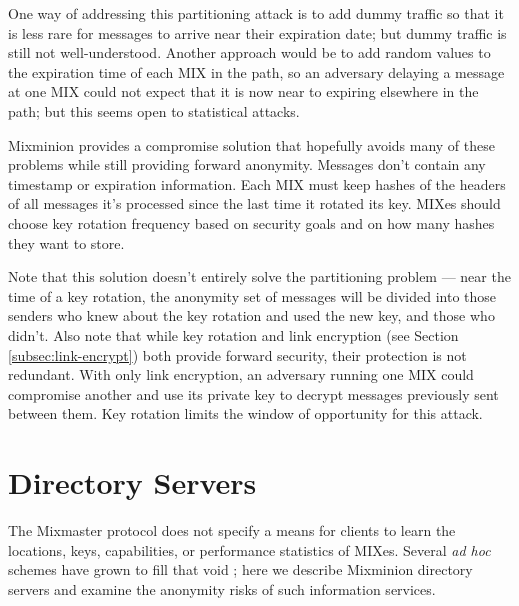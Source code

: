 \documentclass{llncs}
\begin{document}
One way of addressing this partitioning attack is to add dummy traffic
so that it is less rare for messages to arrive near their expiration date;
but dummy traffic is still not well-understood. Another approach would
be to add random values to the expiration time of each MIX in the path,
so an adversary delaying a message at one MIX could not expect that it
is now near to expiring elsewhere in the path; but this seems open to
statistical attacks.


Mixminion provides a compromise solution that hopefully avoids many of
these problems while still providing forward anonymity. Messages don't
contain any timestamp or expiration information. Each MIX must keep
hashes of the headers of all messages it's processed since the last time
it rotated its key. MIXes should choose key rotation frequency based on
security goals and on how many hashes they want to store.

Note that this solution doesn't entirely solve the partitioning problem
--- near the time of a key rotation, the anonymity set of messages will
be divided into those senders who knew about the key rotation and used
the new key, and those who didn't.
Also note that while key rotation and link encryption (see Section
\ref{subsec:link-encrypt}) both provide forward security, their protection
is not redundant. With only link encryption, an adversary running
one MIX could compromise another and use its private key to decrypt
messages previously sent between them. Key rotation limits the window
of opportunity for this attack.


\section{Directory Servers}
\label{sec:dir-servers}

The Mixmaster protocol does not specify a means for clients to learn the
locations, keys, capabilities, or performance statistics of MIXes. Several
\emph{ad hoc} schemes have grown to fill that void \cite{levien}; here
we describe Mixminion directory servers and examine the anonymity risks
of such information services.
\end{document}
